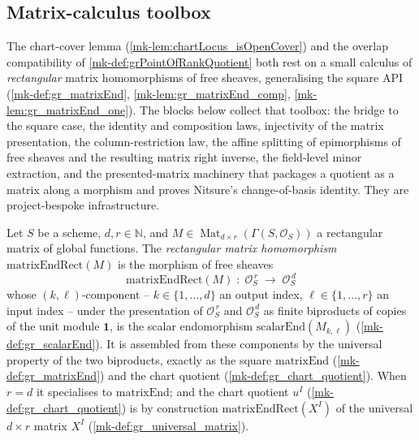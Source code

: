 \subsection{Matrix-calculus toolbox}

The chart-cover lemma (\ref{mk-lem:chartLocus_isOpenCover}) and the overlap compatibility of
\ref{mk-def:grPointOfRankQuotient} both rest on a small calculus of \emph{rectangular} matrix
homomorphisms of free sheaves, generalising the square API
(\ref{mk-def:gr_matrixEnd}, \ref{mk-lem:gr_matrixEnd_comp}, \ref{mk-lem:gr_matrixEnd_one}). The
blocks below collect that toolbox: the bridge to the square case, the identity and
composition laws, injectivity of the matrix presentation, the column-restriction law, the
affine splitting of epimorphisms of free sheaves and the resulting matrix right inverse, the
field-level minor extraction, and the presented-matrix machinery that packages a quotient as
a matrix along a morphism and proves Nitsure's change-of-basis identity. They are
project-bespoke infrastructure.


\begin{definition}\label{mk-def:gr_matrixEndRect}
  \leanok

  Let \(S\) be a scheme, \(d, r \in \mathbb{N}\), and
  \(M \in \operatorname{Mat}_{d \times r}(\Gamma(S, \mathcal{O}_S))\) a rectangular matrix
  of global functions. The \emph{rectangular matrix homomorphism}
  \(\mathrm{matrixEndRect}(M)\) is the morphism of free sheaves
  \[
    \mathrm{matrixEndRect}(M) \;:\; \mathcal{O}_S^{\,r}
      \;\longrightarrow\; \mathcal{O}_S^{\,d}
  \]
  whose \((k,\ell)\)-component -- \(k \in \{1,\dots,d\}\) an output index,
  \(\ell \in \{1,\dots,r\}\) an input index -- under the presentation of
  \(\mathcal{O}_S^{\,r}\) and \(\mathcal{O}_S^{\,d}\) as finite biproducts of copies of the
  unit module \(\mathbf 1\), is the scalar endomorphism \(\mathrm{scalarEnd}(M_{k,\ell})\)
  (\ref{mk-def:gr_scalarEnd}). It is assembled from these components by the universal property
  of the two biproducts, exactly as the square \(\mathrm{matrixEnd}\)
  (\ref{mk-def:gr_matrixEnd}) and the chart quotient (\ref{mk-def:gr_chart_quotient}). When
  \(r = d\) it specialises to \(\mathrm{matrixEnd}\); and the chart quotient \(u^I\)
  (\ref{mk-def:gr_chart_quotient}) is by construction \(\mathrm{matrixEndRect}(X^I)\) of the
  universal \(d \times r\) matrix \(X^I\) (\ref{mk-def:gr_universal_matrix}).
\end{definition}

